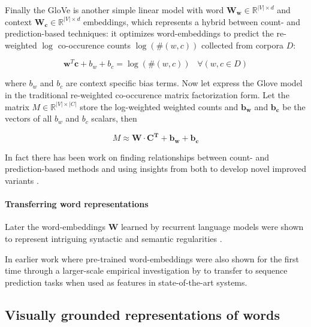 Finally the GloVe \cite{pennington2014glove} is another simple linear model
with word $\mathbf{W_w}  \in \mathbb{R}^{|V| \times d}$ and context
$\mathbf{W_c} \in \mathbb{R}^{|V| \times d}$ embeddings, which
represents a hybrid between count- and prediction-based techniques:
it optimizes word-embeddings to predict the re-weighted
$\log$ co-occurence counts $\log(\#(w,c))$ collected from corpora $D$:

\begin{equation}
\label{eq:glove}
\mathbf{w}^T\mathbf{c} + b_w + b_c = \log(\#(w,c))\;\;\; \forall (w,c \in D)
\end{equation}

where $b_w$ and $b_c$ are context specific bias terms.
Now let express the Glove model in the traditional re-weighted
co-occurence matrix factorization form.
Let the matrix $M \in \mathbb{R}^{|V| \times |C|}$ store the log-weighted
weighted counts and $\mathbf{b_w}$ and $\mathbf{b_c}$ be the vectors of all
$b_w$ and $b_c$ scalars, then

\begin{equation}
\label{eq:glove2}
M \approx \mathbf{W} \cdot \mathbf{C^T} + \mathbf{b_w} + \mathbf{b_c}
\end{equation}

In fact there has been work on finding relationships between
count- and prediction-based methods \cite{levy2014neural} and
using insights from both to develop novel improved
variants \cite{levy2015improving}.

\paragraph{Transferring word representations}

Later the word-embeddings $\mathbf{W}$ learned by recurrent language models were
shown to represent intriguing syntactic and semantic regularities \cite{mikolov2013linguistic}.

In earlier work where pre-trained word-embeddings were also shown for the first time through a
larger-scale empirical investigation by \cite{turian2010word} to transfer to sequence prediction tasks
when used as features in state-of-the-art systems.


\subsection{Visually grounded representations of words}
\label{sec:visualwords}

